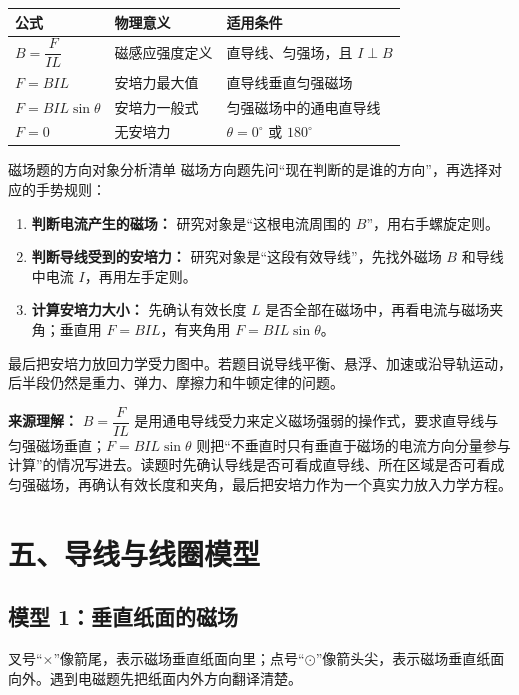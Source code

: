 \begin{center}
\begin{tabular}{lll}
\toprule
公式 & 物理意义 & 适用条件 \\
\midrule
$B=\dfrac{F}{IL}$ & 磁感应强度定义 & 直导线、匀强场，且 $I\perp B$ \\
$F=BIL$ & 安培力最大值 & 直导线垂直匀强磁场 \\
$F=BIL\sin\theta$ & 安培力一般式 & 匀强磁场中的通电直导线 \\
$F=0$ & 无安培力 & $\theta=0^\circ$ 或 $180^\circ$ \\
\bottomrule
\end{tabular}
\end{center}

\begin{learningbox}{磁场题的方向对象分析清单}
磁场方向题先问“现在判断的是谁的方向”，再选择对应的手势规则：
\begin{enumerate}
  \item \textbf{判断电流产生的磁场：} 研究对象是“这根电流周围的 $B$”，用右手螺旋定则。
  \item \textbf{判断导线受到的安培力：} 研究对象是“这段有效导线”，先找外磁场 $B$ 和导线中电流 $I$，再用左手定则。
  \item \textbf{计算安培力大小：} 先确认有效长度 $L$ 是否全部在磁场中，再看电流与磁场夹角；垂直用 $F=BIL$，有夹角用 $F=BIL\sin\theta$。
\end{enumerate}
最后把安培力放回力学受力图中。若题目说导线平衡、悬浮、加速或沿导轨运动，后半段仍然是重力、弹力、摩擦力和牛顿定律的问题。

\textbf{来源理解：} $B=\dfrac{F}{IL}$ 是用通电导线受力来定义磁场强弱的操作式，要求直导线与匀强磁场垂直；$F=BIL\sin\theta$ 则把“不垂直时只有垂直于磁场的电流方向分量参与计算”的情况写进去。读题时先确认导线是否可看成直导线、所在区域是否可看成匀强磁场，再确认有效长度和夹角，最后把安培力作为一个真实力放入力学方程。
\end{learningbox}

\section*{五、导线与线圈模型}

\subsection*{模型 1：垂直纸面的磁场}

叉号“$\times$”像箭尾，表示磁场垂直纸面向里；点号“$\odot$”像箭头尖，表示磁场垂直纸面向外。遇到电磁题先把纸面内外方向翻译清楚。

